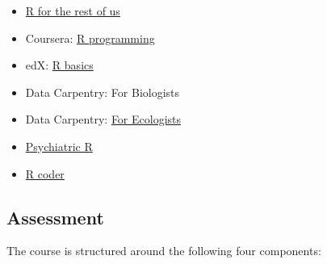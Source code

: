 \documentclass[
  letterpaper,
  DIV=11,
  numbers=noendperiod]{scrartcl}
\providecommand{\tightlist}{%
  \setlength{\itemsep}{0pt}\setlength{\parskip}{0pt}}\usepackage{longtable,booktabs,array}
\begin{document}
\begin{itemize}
\tightlist
\item
  \href{https://rfortherestofus.com/}{R for the rest of us}
\item
  Coursera: \href{https://www.coursera.org/learn/r-programming}{R
  programming}
\item
  edX: \href{https://www.edx.org/course/data-science-r-basics}{R basics}
\item
  Data Carpentry: For Biologists
\item
  Data Carpentry:
  \href{https://datacarpentry.org/lessons/\#ecology-workshop}{For
  Ecologists}
\item
  \href{https://psyteachr.github.io/}{Psychiatric R}
\item
  \href{https://r-coder.com/}{R coder}
\end{itemize}

\hypertarget{assessment}{%
\subsection{Assessment}\label{assessment}}

The course is structured around the following four components:
\end{document}

